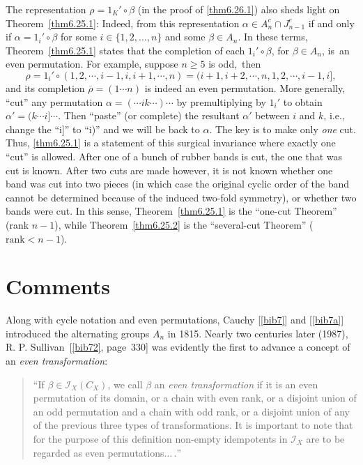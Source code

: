 \documentclass{surv-l}
\numberwithin{equation}{section}
\numberwithin{table}{section}
\numberwithin{figure}{section}
\theoremstyle{plain}
\theoremstyle{definition}
\begin{document}
The representation $\rho=1_{K}'\circ\beta$ (in the proof of
\ref{thm6.26.1}) also sheds light on Theorem~\ref{thm6.25.1}:
Indeed, from this representation $\alpha\in A_{n}^{c}\cap
J_{n-1}^{e}$ if and only if $\alpha=1_{i}'\circ\beta$ for some
$i\in\{1,2,\ldots, n\}$ and some $\beta\in A_{n}$. In these terms,
Theorem~\ref{thm6.25.1} states that the completion
of each $1_{i}'\circ\beta$, for
$\beta\in A_{n}$, is~an even permutation. For example, suppose $n
\geq 5$ is odd,~then
\[
\rho=1_{i}'\circ(1,2, \cdots, i-1, i, i+1, \cdots, n) =(i+1, i+2,
\cdots, n, 1, 2, \cdots, i-1, i],
\]
and its completion $\overline{\rho}=(1\cdots n)$ is indeed an even
permutation. More generally, ``cut'' any permutation
$\alpha=(\cdots ik\cdots)\cdots$ by premultiplying by $1_{i}'$ to
obtain $\alpha'=(k\cdots i]\cdots$. Then ``paste'' (or complete)
the resultant $\alpha'$ between $i$ and $k$, i.e., change the
``i]'' to ``i)'' and we will be back to $\alpha$. The key is to
make only \emph{one} cut. Thus, \ref{thm6.25.1} is a statement of
this surgical invariance where exactly one ``cut'' is allowed.
After one of a bunch of rubber bands is cut, the one that was cut
is known. After two cuts are made however, it is not known whether
one band was cut into two pieces (in which case the original
cyclic order of the band cannot be determined because of the
induced two-fold symmetry), or whether two bands were cut. In this
sense, Theorem~\ref{thm6.25.1} is the ``one-cut Theorem'' (rank $n
-1$), while Theorem~\ref{thm6.25.2} is the ``several-cut Theorem''
($\mathrm{rank} <n -1$).

\section{Comments}\label{sec6.27}

Along with cycle notation and even permutations,
Cauchy [\ref{bib7}] and
[\ref{bib7a}] introduced the alternating groups
$A_{n}$ in 1815. Nearly two centuries later (1987), R. P.
Sullivan~[\ref{bib72},
page~330] was evidently the first to advance a concept of an
\emph{even transformation}:
\begin{quote}
\quad ``If $\beta\in \mathcal{I}_{X}(C_{X})$, we call $\beta$ an
\emph{even transformation} if it is an
even permutation of its domain, or a chain with even rank, or a
disjoint union of an odd permutation and a chain with odd rank, or
a disjoint union of any of the previous three types of
transformations. It is important to note that for the purpose of
this definition non-empty idempotents in $\mathcal{I}_{X}$ are to
be regarded as even permutations$\ldots\,.$''
\end{quote}
\end{document}
